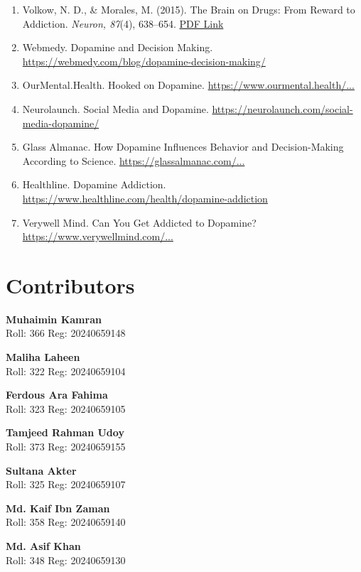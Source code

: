 \documentclass[a4paper,10pt,twocolumn]{memoir}
\newcommand{\contributor}[4]{%
  \vspace{0.4em}
  \begin{minipage}{\textwidth}
    \textbf{\normalsize #1}\\
    {\footnotesize Roll: #2 \quad Reg: #3}\\
    {\footnotesize\color{gray}#4}
  \end{minipage}
}
\begin{document}
{{{{{{\begin{enumerate}
    \item Volkow, N. D., \& Morales, M. (2015). The Brain on Drugs: From Reward to Addiction. \textit{Neuron, 87}(4), 638–654. \href{https://www.cell.com/neuron/pdf/S0896-6273(15)00133-6.pdf}{PDF Link}
    \item Webmedy. Dopamine and Decision Making. \href{https://webmedy.com/blog/dopamine-decision-making/}{https://webmedy.com/blog/dopamine-decision-making/}
    \item OurMental.Health. Hooked on Dopamine. \href{https://www.ourmental.health/screen-time-sanity/hooked-on-dopamine-how-social-media-hijacks-your-brain}{https://www.ourmental.health/...}
    \item Neurolaunch. Social Media and Dopamine. \href{https://neurolaunch.com/social-media-dopamine/}{https://neurolaunch.com/social-media-dopamine/}
    \item Glass Almanac. How Dopamine Influences Behavior and Decision-Making According to Science. \href{https://glassalmanac.com/how-dopamine-influences-behavior-and-decision-making-according-to-science/}{https://glassalmanac.com/...}
    \item Healthline. Dopamine Addiction. \href{https://www.healthline.com/health/dopamine-addiction}{https://www.healthline.com/health/dopamine-addiction}
    \item Verywell Mind. Can You Get Addicted to Dopamine? \href{https://www.verywellmind.com/can-you-get-addicted-to-dopamine-5207433}{https://www.verywellmind.com/...}
\end{enumerate} 

\clearpage
\section*{Contributors}
\vspace*{0.2cm}  %

\contributor{Muhaimin Kamran}{366}{20240659148}{}
\contributor{Maliha Laheen}{322}{20240659104}{}
\contributor{Ferdous Ara Fahima}{323}{20240659105}{}
\contributor{Tamjeed Rahman Udoy}{373}{20240659155}{}
\contributor{Sultana Akter}{325}{20240659107}{}
\contributor{Md. Kaif Ibn Zaman}{358}{20240659140}{}
\contributor{Md. Asif Khan}{348}{20240659130}{}


}}}}}}
\end{document}
